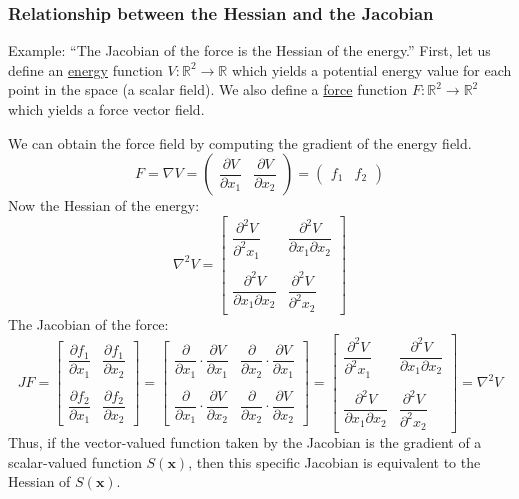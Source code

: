 \documentclass{article}
\begin{document}
\subsubsection{Relationship between the Hessian and the Jacobian}
Example: ``The Jacobian of the force is the Hessian of the energy.''
First, let us define an \underline{energy} function $V : \mathbb{R}^2 \rightarrow \mathbb{R}$ which yields a potential energy value for each point in the space (a scalar field). We also define a \underline{force} function $F : \mathbb{R}^2 \rightarrow \mathbb{R}^2$ which yields a force vector field.

We can obtain the force field by computing the gradient of the energy field.
\[
    F = \nabla V =
    \begin{pmatrix}
        \dfrac{\partial V}{\partial x_1} &
        \dfrac{\partial V}{\partial x_2}
    \end{pmatrix} = 
    \begin{pmatrix} f_1 & f_2 \end{pmatrix}
\]
Now the Hessian of the energy:
\[
    \nabla^2 V =
    \begin{bmatrix}
        \dfrac{\partial^2 V}{\partial^2 x_1} & \dfrac{\partial^2 V}{\partial x_1 \partial x_2}  \\ \\
        \dfrac{\partial^2 V}{\partial x_1 \partial x_2} & \dfrac{\partial^2 V}{\partial^2 x_2}
    \end{bmatrix}
\]
The Jacobian of the force:
\[
    J F =
    \begin{bmatrix}
        \dfrac{\partial f_1}{\partial x_1} & \dfrac{\partial f_1}{\partial x_2} \\ \\
        \dfrac{\partial f_2}{\partial x_1} & \dfrac{\partial f_2}{\partial x_2}
    \end{bmatrix} = 
    \begin{bmatrix}
        \dfrac{\partial}{\partial x_1} \cdot \dfrac{\partial V}{\partial x_1} &
        \dfrac{\partial}{\partial x_2} \cdot \dfrac{\partial V}{\partial x_1} \\ \\
        \dfrac{\partial}{\partial x_1} \cdot \dfrac{\partial V}{\partial x_2} &
        \dfrac{\partial}{\partial x_2} \cdot \dfrac{\partial V}{\partial x_2}
    \end{bmatrix} = 
    \begin{bmatrix}
        \dfrac{\partial^2 V}{\partial^2 x_1} & \dfrac{\partial^2 V}{\partial x_1 \partial x_2}  \\ \\
        \dfrac{\partial^2 V}{\partial x_1 \partial x_2} & \dfrac{\partial^2 V}{\partial^2 x_2}
    \end{bmatrix} = \nabla^2 V
\]
Thus, if the vector-valued function taken by the Jacobian is the gradient of a scalar-valued function $S(\mathbf{x})$, then this specific Jacobian is equivalent to the Hessian of $S(\mathbf{x})$.
\end{document}

